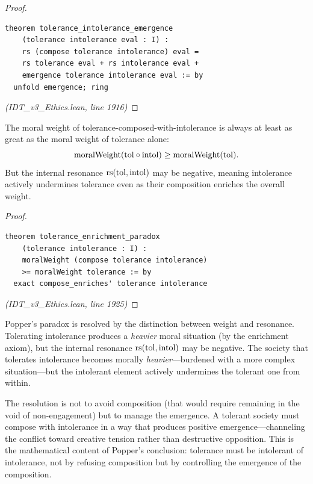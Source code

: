 \begin{proof}
\begin{lstlisting}
theorem tolerance_intolerance_emergence
    (tolerance intolerance eval : I) :
    rs (compose tolerance intolerance) eval =
    rs tolerance eval + rs intolerance eval +
    emergence tolerance intolerance eval := by
  unfold emergence; ring
\end{lstlisting}
\textit{(IDT\_v3\_Ethics.lean, line 1916)}
\end{proof}

\begin{theorem}
\label{thm:tolerance-paradox}
The moral weight of tolerance-composed-with-intolerance is always at
least as great as the moral weight of tolerance alone:
\[
  \mathrm{moralWeight}(\mathrm{tol} \circ \mathrm{intol})
  \geq \mathrm{moralWeight}(\mathrm{tol}).
\]
But the internal resonance $\mathrm{rs}(\mathrm{tol}, \mathrm{intol})$ may be
negative, meaning intolerance actively undermines tolerance even as their
composition enriches the overall weight.
\end{theorem}

\begin{proof}
\begin{lstlisting}
theorem tolerance_enrichment_paradox
    (tolerance intolerance : I) :
    moralWeight (compose tolerance intolerance)
    >= moralWeight tolerance := by
  exact compose_enriches' tolerance intolerance
\end{lstlisting}
\textit{(IDT\_v3\_Ethics.lean, line 1925)}
\end{proof}

\begin{interpretation}
Popper's paradox is resolved by the distinction between weight and
resonance. Tolerating intolerance produces a \emph{heavier} moral
situation (by the enrichment axiom), but the internal resonance
$\mathrm{rs}(\mathrm{tol}, \mathrm{intol})$ may be negative. The society that
tolerates intolerance becomes morally \emph{heavier}---burdened with a
more complex situation---but the intolerant element actively undermines
the tolerant one from within.

The resolution is not to avoid composition (that would require remaining
in the void of non-engagement) but to manage the emergence. A tolerant
society must compose with intolerance in a way that produces positive
emergence---channeling the conflict toward creative tension rather than
destructive opposition. This is the mathematical content of Popper's
conclusion: tolerance must be intolerant of intolerance, not by refusing
composition but by controlling the emergence of the composition.
\end{interpretation}

